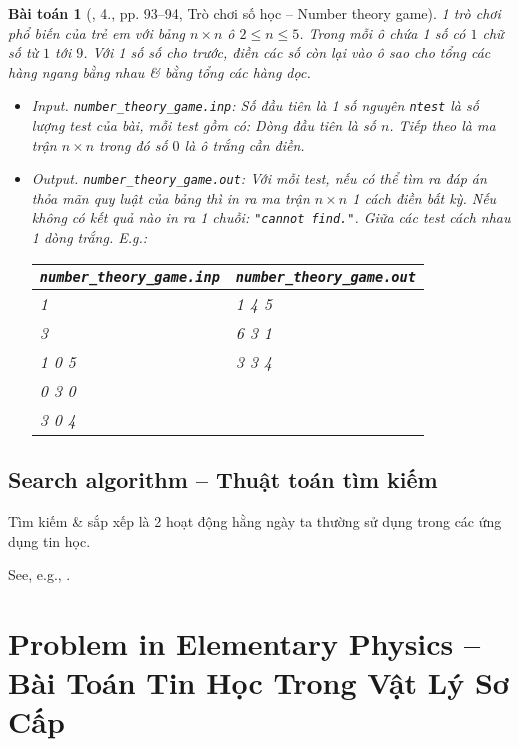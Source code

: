 \documentclass{article}
\newtheorem{baitoan}{Bài toán}
\begin{document}
\begin{baitoan}[\cite{VietSTEM2021}, 4., pp. 93--94, Trò chơi số học -- Number theory game]
	1 trò chơi phổ biến của trẻ em với bảng $n\times n$ ô $2\le n\le5$. Trong mỗi ô chứa 1 số có $1$ chữ số từ $1$ tới $9$. Với 1 số số cho trước, điền các số còn lại vào ô sao cho tổng các hàng ngang bằng nhau \& bằng tổng các hàng dọc.
	\begin{itemize}
		\item {\sf Input.} \verb|number_theory_game.inp|: Số đầu tiên là 1 số nguyên \texttt{ntest} là số lượng test của bài, mỗi test gồm có: Dòng đầu tiên là số $n$. Tiếp theo là ma trận $n\times n$ trong đó số $0$ là ô trắng cần điền.		
		\item {\sf Output.} \verb|number_theory_game.out|: Với mỗi test, nếu có thể tìm ra đáp án thỏa mãn quy luật của bảng thì in ra ma trận $n\times n$ 1 cách điền bất kỳ. Nếu không có kết quả nào in ra 1 chuỗi: \texttt{"cannot find."}. Giữa các test cách nhau 1 dòng trắng. E.g.:
		\begin{table}[H]
			\centering
			\begin{tabular}{|l|l|}
				\hline
				\verb|number_theory_game.inp| & \verb|number_theory_game.out| \\
				\hline
				1 & 1 4 5 \\
				3 & 6 3 1 \\
				1 0 5 & 3 3 4 \\
				0 3 0 & \\
				3 0 4 & \\
				\hline
			\end{tabular}
		\end{table}		
	\end{itemize}
\end{baitoan}
	

\subsection{Search algorithm -- Thuật toán tìm kiếm}
Tìm kiếm \& sắp xếp là 2 hoạt động hằng ngày ta thường sử dụng trong các ứng dụng tin học.

See, e.g., \cite[Chap. 6: Searching]{Knuth1998}.


\section{Problem in Elementary Physics -- Bài Toán Tin Học Trong Vật Lý Sơ Cấp}
\end{document}
